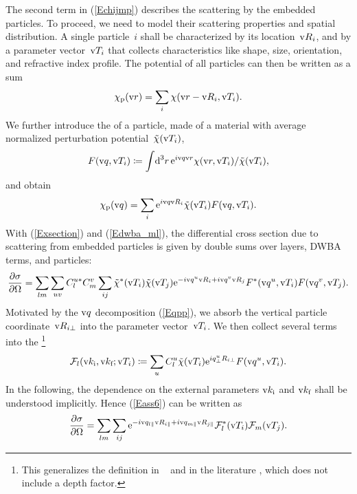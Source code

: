 The second term in (\ref{Echijmp}) describes the scattering
by the embedded particles.
To proceed, we need to model their scattering properties
and spatial distribution.
A single particle~$i$ shall be characterized by its location~$\text{v}{R}_i$,
and by a parameter vector~$\text{v}{T}_i$ that collects
characteristics like shape, size, orientation, and refractive index profile.
The potential of all particles can then be written as a sum
\begin{equation}
  \chi_\text{p}(\text{v}{r}) = \sum_i \chi(\text{v}{r}-\text{v}{R}_i,\text{v}{T}_i).
\end{equation}
We further introduce the 
%
of a particle,
made of a material
with average normalized perturbation potential~$\tilde\chi(\text{v}{T}_i)$,
\begin{equation}\label{EFFdef}
  F(\text{v}{q},\text{v}{T}_i) \coloneqq  \int\!\text{d}^3r\,\text{e}^{i\text{v}{q}\text{v}{r}}\chi(\text{v}{r},\text{v}{T}_i)/\tilde\chi(\text{v}{T}_i),
\end{equation}
and obtain
\begin{equation}
  \chi_\text{p}(\text{v}{q}) = \sum_i \text{e}^{i\text{v}{q}\text{v}{R}_i} \tilde\chi(\text{v}{T}_i) F(\text{v}{q},\text{v}{T}_i).
\end{equation}
With (\ref{Exsection}) and (\ref{Edwba_ml}),
the differential cross section due to scattering from embedded particles is
given by double sums over layers, DWBA terms, and particles:
\begin{equation}\label{Eass6}
  \frac{\partial\sigma}{\partial\Omega}
  = \sum_{lm} \sum_{uv} C^{u*}_l C^v_m \sum_{ij} \tilde\chi^*(\text{v}{T}_i) \tilde\chi(\text{v}{T}_j)
    \text{e}^{-i\text{v}{q}^u \text{v}{R}_i +i \text{v}{q}^v \text{v}{R}_j} F^*(\text{v}{q}^u,\text{v}{T}_i) F(\text{v}{q}^v,\text{v}{T}_j).
\end{equation}
Motivated by the $\text{v}{q}$ decomposition (\ref{Eqpp}),
we absorb the vertical particle coordinate~$\text{v}{R}_{i\perp}$
into the parameter vector~$\text{v}{T}_i$.
We then collect several terms into the \footnote
{This generalizes the definition in \IsGISAXS\ \cite[Sec.~2.4.1]{Laz08}
  and in the literature \cite[p.~292]{ReLL09},
which does not include a depth factor.}
\begin{equation}
  \mathcal{F}_l(\text{v}{k}_{\text{i}},\text{v}{k}_{\text{f}};\text{v}{T}_i)
  \coloneqq  \sum_u C^u_l\tilde\chi(\text{v}{T}_i) \text{e}^{iq^u_\perp R_{i\perp}} F(\text{v}{q}^u,\text{v}{T}_i).
\end{equation}
In the following, the dependence on the external parameters
$\text{v}{k}_{\text{i}}$ and $\text{v}{k}_{\text{f}}$ shall be understood implicitly.
Hence (\ref{Eass6}) can be written as
\begin{equation}\label{Eass4}
  \frac{\partial\sigma}{\partial\Omega}
  = \sum_{lm} \sum_{ij} \text{e}^{-i\text{v}{q}_{l\parallel}\text{v}{R}_{i\parallel}+i\text{v}{q}_{m\parallel}\text{v}{R}_{j\parallel}}
    \mathcal{F}^*_l(\text{v}{T}_i) \mathcal{F}_m(\text{v}{T}_j).
\end{equation}

